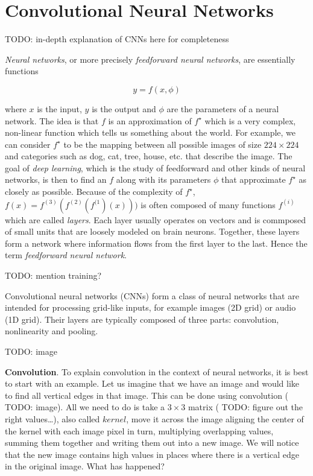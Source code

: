 \chapter{Convolutional Neural Networks}
\label{chapter:appendix-cnns}

{\color{red} TODO: in-depth explanation of CNNs here for completeness}

\textit{Neural networks}, or more precisely \textit{feedforward neural networks}, are essentially functions

\begin{equation}
    \label{eq:neural_network}
    y = f(x, \phi)
\end{equation}

where \(x\) is the input, \(y\) is the output and \(\phi\) are the parameters of a neural network. The idea is that \(f\) is an approximation of \(f^\star\) which is a very complex, non-linear function which tells us something about the world. For example, we can consider \(f^\star\) to be the mapping between all possible images of size \(224 \times 224\) and categories such as dog, cat, tree, house, etc. that describe the image. The goal of \textit{deep learning}, which is the study of feedforward and other kinds of neural networks, is then to find an \(f\) along with its parameters \(\phi\) that approximate \(f^\star\) as closely as possible. Because of the complexity of \(f^\star\), \(f(x) = f^{(3)}(f^{(2)}(f^{(1})(x)))\) is often composed of many functions \(f^{(i)}\) which are called \textit{layers}. Each layer usually operates on vectors and is commposed of small units that are loosely modeled on brain neurons. Together, these layers form a network where information flows from the first layer to the last. Hence the term \textit{feedforward neural network}.

{\color{red} TODO: mention training?}

Convolutional neural networks (CNNs) form a class of neural networks that are intended for processing grid-like inputs, for example images (2D grid) or audio (1D grid). Their layers are typically composed of three parts: convolution, nonlinearity and pooling.

{\color{red} TODO: image}

\textbf{Convolution}. To explain convolution in the context of neural networks, it is best to start with an example. Let us imagine that we have an image and would like to find all vertical edges in that image. This can be done using convolution ({\color{red} TODO: image}). All we need to do is take a \(3 \times 3\) matrix ({\color{red} TODO: figure out the right values\dots}), also called \(kernel\), move it across the image aligning the center of the kernel with each image pixel in turn, multiplying overlapping values, summing them together and writing them out into a new image. We will notice that the new image contains high values in places where there is a vertical edge in the original image. What has happened?

